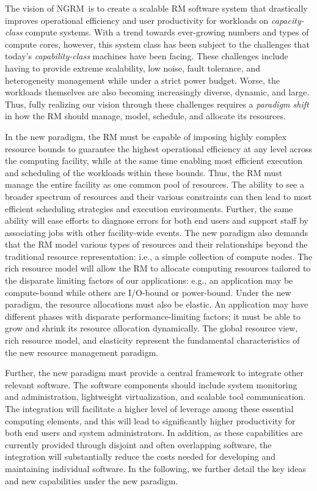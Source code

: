\documentclass[10pt]{article}
\newcommand{\ngrm}{NGRM}
\begin{document}
The vision of \ngrm\ is to create a scalable RM software system that 
drastically improves operational efficiency and user productivity 
for workloads on {\em capacity-class} compute systems.
With a trend towards ever-growing numbers and types of compute cores, however,
this system class has been subject to the challenges that
today's {\em capability-class} machines have been facing. 
These challenges include having to provide extreme scalability, low noise, 
fault tolerance, and heterogeneity management while under a strict power budget.
Worse, the workloads themselves are also becoming increasingly diverse, 
dynamic, and large. Thus, fully realizing our vision through these challenges requires
a {\em paradigm shift} in how the RM should manage, model, schedule,
and allocate its resources.

In the new paradigm, the RM must be capable of imposing highly complex resource bounds
to guarantee the highest operational efficiency at any level
across the computing facility, while at the same time enabling most efficient execution
and scheduling of the workloads within these bounds.
Thus, the RM must manage the entire facility as one
common pool of resources. The ability to see a broader spectrum of resources 
and their various constraints can then lead to most efficient scheduling strategies
and execution environments. Further, the same ability will ease 
efforts to diagnose errors for both end users and support staff
by associating jobs with other facility-wide events. 
The new paradigm also demands that the RM model
various types of resources and their relationships beyond the traditional resource representation:
i.e., a simple collection of compute nodes.
The rich resource model will allow the RM to allocate computing resources
tailored to the disparate limiting factors of our applications: e.g.,
an application may be compute-bound while others are I/O-bound or power-bound.
Under the new paradigm, the resource allocations must also be elastic. 
An application may have different phases with disparate performance-limiting factors;
it must be able to grow and shrink its resource allocation dynamically. 
The global resource view, rich resource model, and elasticity represent
the fundamental characteristics of the new resource management paradigm.

Further, the new paradigm must provide a central framework to integrate
other relevant software. The software components should include   
system monitoring and administration, lightweight virtualization, 
and scalable tool communication. The integration will 
facilitate a higher level of leverage among these essential computing elements, 
and this will lead to significantly higher productivity 
for both end users and system administrators.  
In addition, as these capabilities are currently provided through disjoint
and often overlapping software, the integration will substantially reduce
the costs needed for developing and maintaining individual software.  
In the following, we further detail the key ideas and new capabilities 
under the new paradigm.
\end{document}
